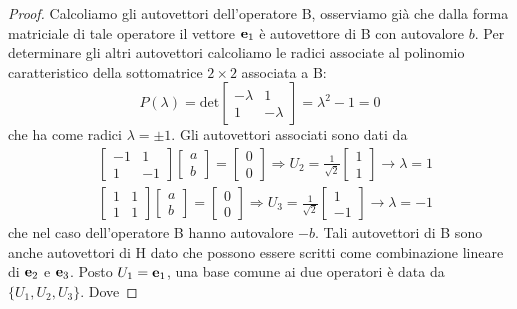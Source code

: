 \begin{proof}
	Calcoliamo gli autovettori dell'operatore B, osserviamo gi\`a che dalla forma matriciale di tale operatore il vettore $\bold{e}_1$ \`e autovettore di B con autovalore $b$. Per determinare gli altri autovettori calcoliamo le radici associate al polinomio caratteristico della sottomatrice $2 \times 2$ associata a B:
	\begin{equation*}
		P(\lambda) = \text{det} \left [ \begin{array}{cc}
		-\lambda & 1 \\ 1 & -\lambda   
		\end{array} \right ] = \lambda^2-1 = 0
	\end{equation*}
	che ha come radici $\lambda = \pm 1$. Gli autovettori associati sono dati da 
	\begin{align*}
		&\left [ \begin{array}{cc}
		-1 & 1 \\ 1 & -1   
		\end{array} \right ] \left [\begin{array}{c} 
			a \\ b
		\end{array}\right ] = \left [\begin{array}{c} 
			0 \\ 0
		\end{array}\right ] \Rightarrow U_2 = \frac{1}{\sqrt{2}}\left [\begin{array}{c} 
			1 \\ 1
		\end{array}\right ] \rightarrow \lambda =1 \\[0.5cm]
		& \left [ \begin{array}{cc}
		1 & 1 \\ 1 & 1   
		\end{array} \right ] \left [\begin{array}{c} 
			a \\ b
		\end{array}\right ] = \left [\begin{array}{c} 
			0 \\ 0
		\end{array}\right ] \Rightarrow U_3 = \frac{1}{\sqrt{2}}\left [\begin{array}{c} 
			1 \\ -1
		\end{array}\right ] \rightarrow \lambda = -1
	\end{align*}
	che nel caso dell'operatore B hanno autovalore $-b$. Tali autovettori di B sono anche autovettori di H dato che possono essere scritti come combinazione lineare di $\bold{e}_2$ e $\bold{e}_3$. Posto $U_{1} = \bold{e}_{1}$, una base comune ai due operatori \`e data da $\{U_1,U_2,U_3\}$. Dove

\end{proof}
